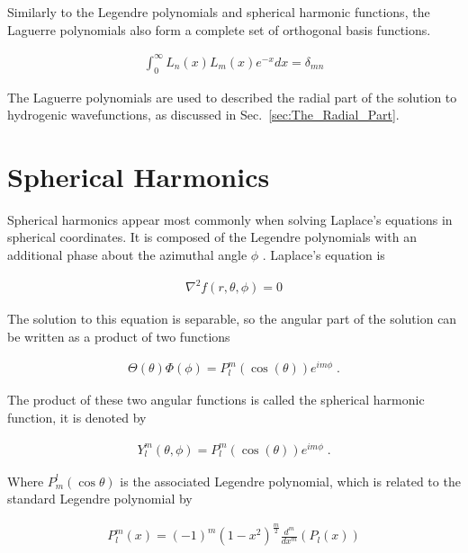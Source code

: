         \noindent Similarly to the Legendre polynomials and spherical harmonic functions, the Laguerre polynomials also form a complete set of orthogonal basis functions.

        \begin{align}
            \int_0^\infty L_n(x) L_m(x) e^{-x} dx = \delta_{m n}
        \end{align}

        \noindent The Laguerre polynomials are used to described the radial part of the solution to hydrogenic wavefunctions, as discussed in Sec.~\ref{sec:The_Radial_Part}. 
        \section{Spherical Harmonics} \label{sec:Spherical_Harmonics}
        Spherical harmonics appear most commonly when solving Laplace's equations in spherical coordinates. It is composed of the Legendre polynomials with an additional phase about the azimuthal angle $\phi$ \cite{Riley_Hobson_Bence_2006}. Laplace's equation is 

        \begin{align}
            \nabla^2 f(r, \theta, \phi) = 0
        \end{align}

        \noindent The solution to this equation is separable, so the angular part of the solution can be written as a product of two functions 

        \begin{align}
            \Theta (\theta) \Phi(\phi) = P^m_l(\cos(\theta)) e^{im\phi}\;.
        \end{align}

        \noindent The product of these two angular functions is called the spherical harmonic function, it is denoted by 

        \begin{align}
            Y^m_l (\theta, \phi) = P^m_l(\cos(\theta)) e^{im\phi}\;.
        \end{align}

        \noindent Where $P^l_m(\cos \theta)$ is the associated Legendre polynomial, which is related to the standard Legendre polynomial by 

        \begin{align}
            P^m_l(x) = (-1)^m (1-x^2)^{\frac{m}{2}} \frac{d^m}{dx^m} \left(P_l(x) \right)
        \end{align}

